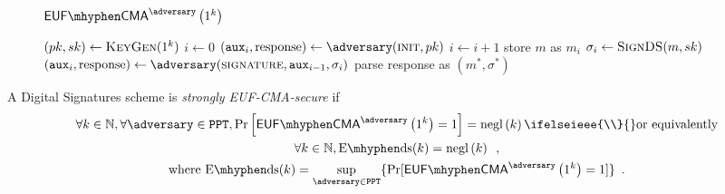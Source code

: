  \begin{figure}[!htbp]
    \begin{gamebox}{$\mathsf{EUF \mhyphen CMA}^{\adversary}\left(1^k\right)$}
      \begin{algorithmic}[1]
        \State $(pk, sk) \gets \textsc{KeyGen}(1^k)$
        \State $i \gets 0$
        \State $(\mathtt{aux}_i, \mathrm{response}) \gets
        \adversary(\textsc{init}, pk)$
          \State $i \gets i + 1$
          \State store $m$ as $m_i$
          \State $\sigma_i \gets \textsc{SignDS}(m, sk)$
          \State $(\mathtt{aux}_i, \mathrm{response}) \gets
          \adversary(\textsc{signature}, \mathtt{aux}_{i-1}, \sigma_i)$
        \EndWhile
        \State parse response as $(m^*, \sigma^*)$
          \State {}
        \Else
          \State {}
        \EndIf
      \end{algorithmic}
    \end{gamebox}
    \caption{}
    \label{game:ds}
  \end{figure}
  \begin{definition}
    \label{def:ds:secure}
    A Digital Signatures scheme is \emph{strongly \textsf{EUF-CMA}-secure} if
    \begin{gather*}
      \forall k \in \mathbb{N}, \forall \adversary \in \mathtt{PPT},
      \Pr\left[\mathsf{EUF \mhyphen CMA}^{\adversary}\left(1^k\right) = 1\right]
      = \mathrm{negl}\left(k\right)
      \ifelseieee{\\}{}
      \text{or equivalently} \\
      \forall k \in \mathbb{N}, \mathrm{E \mhyphen ds}(k) =
      \mathrm{negl}\left(k\right) \enspace, \\
      \text{where } \mathrm{E \mhyphen ds}(k) = \underset{\adversary \in
      \mathtt{PPT}}{\sup}\{\Pr[\mathsf{EUF \mhyphen
      CMA}^{\adversary}\left(1^k\right) = 1]\} \enspace.
    \end{gather*}
  \end{definition}
